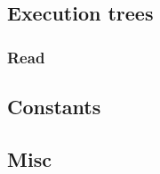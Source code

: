 \documentclass[11pt]{article}
\begin{document}

\hypertarget{execution-trees}{%
\subsection{Execution trees}\label{execution-trees}}

\hypertarget{read}{%
\subsubsection{Read}\label{read}}


\hypertarget{constants}{%
\subsection{Constants}\label{constants}}


\hypertarget{misc}{%
\subsection{Misc}\label{misc}}

\end{document}
